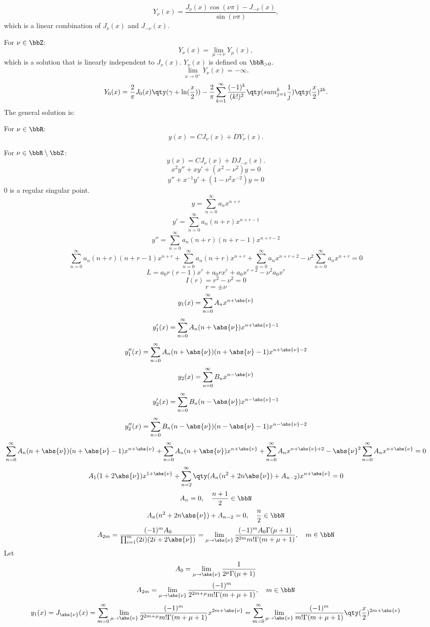 \documentclass[a4paper,12pt]{report}
\begin{document}
    \[Y_{\nu}(x)=\frac{J_{\nu}(x)\cos(\nu\pi)-J_{-\nu}(x)}{\sin(\nu\pi)},\]
    which is a linear combination of $J_{\nu}(x)$ and $J_{-\nu}(x)$.
\item For $\nu\in\bbZ$:
    \[Y_{\nu}(x)=\lim_{\mu\to\nu}Y_{\mu}(x),\]
    which is a solution that is linearly independent to $J_{\nu}(x)$. $Y_{\nu}(x)$ is defined on $\bbR_{>0}$.
    \[\lim_{x\to0^+}Y_{\nu}(x)=-\infty.\]
    \[Y_0(x)=\frac{2}{\pi}J_0(x)\qty(\gamma+\ln(\frac{x}{2}))-\frac{2}{\pi}\sum_{k=1}^{\infty}\frac{(-1)^k}{(k!)^2}\qty(sum_{j=1}^k\frac{1}{j})\qty(\frac{x}{2})^{2k}.\]
\eit
\eit
The general solution is:
\bit
\item For $\nu\in\bbR$:
    \[y(x)=CJ_{\nu}(x)+DY_{\nu}(x).\]
\item For $\nu\in\bbR\setminus\bbZ$:
    \[y(x)=CJ_{\nu}(x)+DJ_{-\nu}(x).\]
\eit
\bpr
\[x^2y''+xy'+(x^2-\nu^2)y=0\]
\[y''+x^{-1}y'+(1-\nu^2x^{-2})y=0\]
$0$ is a regular singular point.
\[y=\sum_{n=0}^{\infty}a_nx^{n+r}\]
\[y'=\sum_{n=0}^{\infty}a_n(n+r)x^{n+r-1}\]
\[y''=\sum_{n=0}^{\infty}a_n(n+r)(n+r-1)x^{n+r-2}\]
\[\sum_{n=0}^{\infty}a_n(n+r)(n+r-1)x^{n+r}+\sum_{n=0}^{\infty}a_n(n+r)x^{n+r}+\sum_{n=0}^{\infty}a_nx^{n+r+2}-\nu^2\sum_{n=0}^{\infty}a_nx^{n+r}=0\]
\[L=a_0r(r-1)x^r+a_0rx^r+a_0x^{r+2}-\nu^2a_0x^r\]
\[I(r)=r^2-\nu^2=0\]
\[r=\pm\nu\]
\[y_1(x)=\sum_{n=0}^{\infty}A_nx^{n+\abs{\nu}}\]
\[y_1'(x)=\sum_{n=0}^{\infty}A_n(n+\abs{\nu})x^{n+\abs{\nu}-1}\]
\[y_1''(x)=\sum_{n=0}^{\infty}A_n(n+\abs{\nu})(n+\abs{\nu}-1)x^{n+\abs{\nu}-2}\]
\[y_2(x)=\sum_{n=0}^{\infty}B_nx^{n-\abs{\nu}}\]
\[y_2'(x)=\sum_{n=0}^{\infty}B_n(n-\abs{\nu})x^{n-\abs{\nu}-1}\]
\[y_2''(x)=\sum_{n=0}^{\infty}B_n(n-\abs{\nu})(n-\abs{\nu}-1)x^{n-\abs{\nu}-2}\]
\[\sum_{n=0}^{\infty}A_n(n+\abs{\nu})(n+\abs{\nu}-1)x^{n+\abs{\nu}}+\sum_{n=0}^{\infty}A_n(n+\abs{\nu})x^{n+\abs{\nu}}+\sum_{n=0}^{\infty}A_nx^{n+\abs{\nu}+2}-\abs{\nu}^2\sum_{n=0}^{\infty}A_nx^{n+\abs{\nu}}=0\]
\[A_1(1+2\abs{\nu})x^{1+\abs{\nu}}+\sum_{n=2}^{\infty}\qty(A_n(n^2+2n\abs{\nu})+A_{n-2})x^{n+\abs{\nu}}=0\]
\[A_n=0,\quad\frac{n+1}{2}\in\bbN\]
\[A_n(n^2+2n\abs{\nu})+A_{n-2}=0,\quad\frac{n}{2}\in\bbN\]
\[A_{2m}=\frac{(-1)^mA_0}{\prod_{i=1}^m(2i)(2i+2\abs{\nu})}=\lim_{\mu\to\abs{\nu}}\frac{(-1)^mA_0\Gamma(\mu+1)}{2^{2m}m!\Gamma(m+\mu+1)},\quad m\in\bbN\]
Let
\[A_0=\lim_{\mu\to\abs{\nu}}\frac{1}{2^\mu\Gamma(\mu+1)}\]
\[A_{2m}=\lim_{\mu\to\abs{\nu}}\frac{(-1)^m}{2^{2m+\mu}m!\Gamma(m+\mu+1)},\quad m\in\bbN\]
\[y_1(x)=J_{\abs{\nu}}(x)=\sum_{m=0}^{\infty}\lim_{\mu\to\abs{\nu}}\frac{(-1)^m}{2^{2m+\mu}m!\Gamma(m+\mu+1)}x^{2m+\abs{\nu}}=\sum_{m=0}^{\infty}\lim_{\mu\to\abs{\nu}}\frac{(-1)^m}{m!\Gamma(m+\mu+1)}\qty(\frac{x}{2})^{2m+\abs{\nu}}\]
\end{document}
